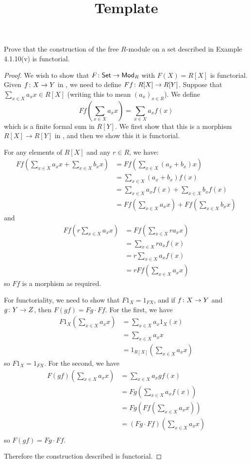 \documentclass[../../solutions]{subfiles}
\title{Template}
\author{}
\begin{document}
\maketitle

\begin{exercise}
  Prove that the construction of the free $R$-module on a set
  described in Example 4.1.10(v) is functorial.
\end{exercise}

\begin{proof}
  We wish to show that ${F}\colon{\ensuremath{\mathsf{Set}}}\to{\ensuremath{\mathsf{Mod}_{R}}}$ with $F(X)=R[X]$ is
  functorial.  Given ${f}\colon{X}\to{Y}$ in \Set, we need to define
  ${Ff}\colon{R[X]}\to{R[Y]}$.  Suppose that $\sum_{x\in X} a_xx\in R[X]$
  (writing this to mean $(a_x)_{x\in R}$).  We define
  $$Ff\left(\sum_{x\in X} a_xx\right) = \sum_{x\in X} a_xf(x)$$
  which is a finite formal sum in $R[Y]$.  We first show that this is
  a morphism $R[X]\to R[Y]$ in , and then we show this it is
  functorial.

  For any elements of $R[X]$ and any $r\in R$, we have:
  \begin{align*}
    Ff\left(\sum_{x\in X} a_xx+\sum_{x\in X} b_xx\right)
         &=Ff\left(\sum_{x\in X} (a_x+b_x)x\right) \\
         &=\sum_{x\in X} (a_x+b_x)f(x) \\
         &= \sum_{x\in X} a_xf(x)+\sum_{x\in X} b_xf(x) \\
         &= Ff\left(\sum_{x\in X} a_xx\right)+Ff\left(\sum_{x\in X}
           b_xx\right)
  \end{align*}
  and
  \begin{align*}
    Ff\left(r\sum_{x\in X} a_xx\right)
         &= Ff\left(\sum_{x\in X} ra_xx\right) \\
         &= \sum_{x\in X} ra_xf(x) \\
         &= r\sum_{x\in X} a_xf(x) \\
         &= rFf\left(\sum_{x\in X} a_xx\right)
  \end{align*}
  so $Ff$ is a morphism as required.

  For functoriality, we need to show that $F1_X=1_{FX}$, and if
  ${f}\colon{X}\to{Y}$ and ${g}\colon{Y}\to{Z}$, then $F(gf)=Fg\cdot Ff$.
  For the first, we have
  \begin{align*}
    F1_X\left(\sum_{x\in X} a_xx\right)
    &= \sum_{x\in X} a_x1_X(x) \\
    &= \sum_{x\in X} a_xx \\
    &= 1_{R[X]}\left(\sum_{x\in X} a_xx\right)
  \end{align*}
  so $F1_X=1_{FX}$.  For the second, we have
  \begin{align*}
    F(gf)\left(\sum_{x\in X} a_xx\right)
    &= \sum_{x\in X} a_xgf(x) \\
    &= Fg\left(\sum_{x\in X} a_xf(x)\right) \\
    &= Fg\left(Ff\left(\sum_{x\in X} a_xx\right)\right) \\
    &= (Fg\cdot Ff)\left(\sum_{x\in X} a_xx\right) \\
  \end{align*}
  so $F(gf)=Fg\cdot Ff$.

  Therefore the construction described is functorial.
\end{proof}
\end{document}
